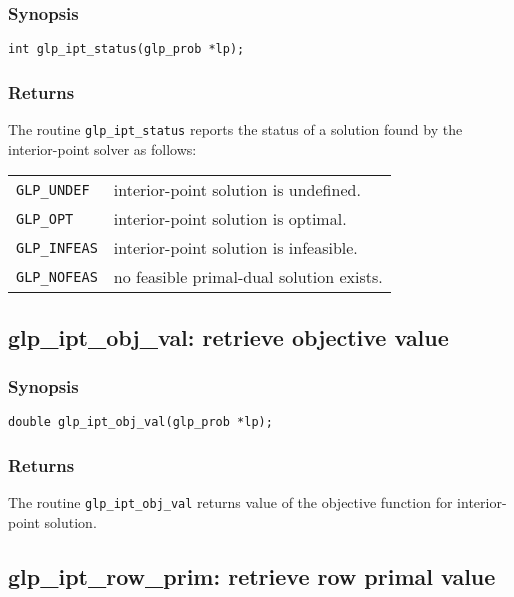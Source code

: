 \subsubsection*{Synopsis}

\begin{verbatim}
int glp_ipt_status(glp_prob *lp);
\end{verbatim}

\subsubsection*{Returns}

The routine \verb|glp_ipt_status| reports the status of a solution
found by the interior-point solver as follows:

\begin{tabular}{@{}p{25mm}p{91.3mm}@{}}
\verb|GLP_UNDEF| & interior-point solution is undefined. \\
\verb|GLP_OPT|   & interior-point solution is optimal. \\
\verb|GLP_INFEAS|& interior-point solution is infeasible. \\
\verb|GLP_NOFEAS|& no feasible primal-dual solution exists.\\
\end{tabular}

\subsection{glp\_ipt\_obj\_val: retrieve objective value}

\subsubsection*{Synopsis}

\begin{verbatim}
double glp_ipt_obj_val(glp_prob *lp);
\end{verbatim}

\subsubsection*{Returns}

The routine \verb|glp_ipt_obj_val| returns value of the objective
function for interior-point solution.

\subsection{glp\_ipt\_row\_prim: retrieve row primal value}

